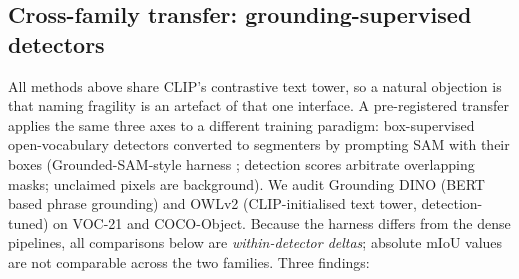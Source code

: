 \documentclass[11pt]{article}
\newcommand{\miou}{mIoU}
\begin{document}
\subsection{Cross-family transfer: grounding-supervised detectors}
\label{sec:crossfam}

All methods above share CLIP's contrastive text tower, so a natural objection
is that naming fragility is an artefact of that one interface. A
pre-registered transfer applies the same three axes to a different training
paradigm: box-supervised open-vocabulary detectors converted to segmenters by
prompting SAM with their boxes (Grounded-SAM-style harness \citep{ren2024groundedsam};
detection scores
arbitrate overlapping masks; unclaimed pixels are background). We audit
Grounding DINO \citep{liu2024groundingdino} (BERT \citep{devlin2019bert} based
phrase grounding) and OWLv2 \citep{minderer2023owlv2} (CLIP-initialised text
tower, detection-tuned) on VOC-21 and COCO-Object. Because the harness
differs from the dense pipelines, all comparisons below are
\emph{within-detector deltas}; absolute \miou{} values are not comparable
across the two families. Three findings:
\end{document}
